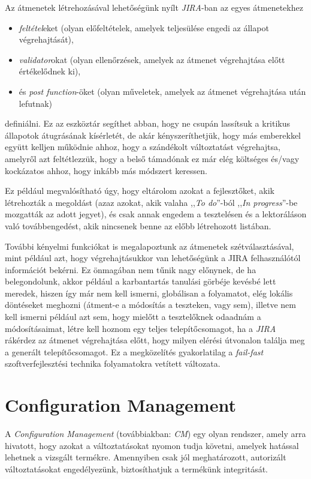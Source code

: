 Az átmenetek létrehozásával lehetőségünk nyílt \emph{JIRA}-ban az egyes átmenetekhez
\begin{itemize}
    \item \emph{feltétel}eket (olyan előfeltételek, amelyek teljesülése engedi az állapot
        végrehajtását),
    \item \emph{validator}okat (olyan ellenőrzések, amelyek az átmenet végrehajtása előtt
        értékelődnek ki),
    \item és \emph{post function}-öket (olyan műveletek, amelyek az átmenet végrehajtása után
        lefutnak)
\end{itemize}
definiálni. Ez az eszköztár segíthet abban, hogy ne csupán lassítsuk a kritikus állapotok
átugrásának kísérletét, de akár kényszeríthetjük, hogy más emberekkel együtt kelljen működnie
ahhoz, hogy a szándékolt változtatást végrehajtsa, amelyről azt feltétlezzük, hogy a belső támadónak
ez már elég költséges és/vagy kockázatos ahhoz, hogy inkább más módszert keressen.

Ez például megvalósítható úgy, hogy eltárolom azokat a fejlesztőket, akik létrehozták a megoldást
(azaz azokat, akik valaha ,,\emph{To do}''-ból ,,\emph{In progress}''-be mozgatták az adott jegyet),
és csak annak engedem a tesztelésen és a lektoráláson való továbbengedést, akik nincsenek benne az
előbb létrehozott listában.

További kényelmi funkciókat is megalapoztunk az átmenetek szétválasztásával, mint például azt, hogy
végrehajtásukkor van lehetőségünk a JIRA felhasználótól információt bekérni.
Ez önmagában nem tűnik nagy előnynek, de ha belegondolunk, akkor például a karbantartás tanulási
görbéje kevésbé lett meredek, hiszen így már nem kell ismerni, globálisan a folyamatot, elég lokális
döntéseket meghozni (átment-e a módosítás a teszteken, vagy sem), illetve nem kell ismerni például
azt sem, hogy mielőtt a tesztelőknek odaadnám a módosításaimat, létre kell hoznom egy teljes
telepítőcsomagot, ha a \emph{JIRA} rákérdez az átmenet végrehajtása előtt, hogy milyen elérési
útvonalon találja meg a generált telepítőcsomagot. Ez a megközelítés gyakorlatilag a
\emph{fail-fast} \cite{FailFast} szoftverfejlesztési technika folyamatokra vetített változata.

\pagebreak[3]
\section{Configuration Management}
A \emph{Configuration Management} (továbbiakban: \emph{CM}) egy olyan rendszer, amely arra hivatott,
hogy azokat a változtatásokat nyomon tudja követni, amelyek hatással lehetnek a vizsgált termékre.
Amennyiben csak jól meghatározott, autorizált változtatásokat engedélyezünk, biztosíthatjuk a
termékünk integritását.

